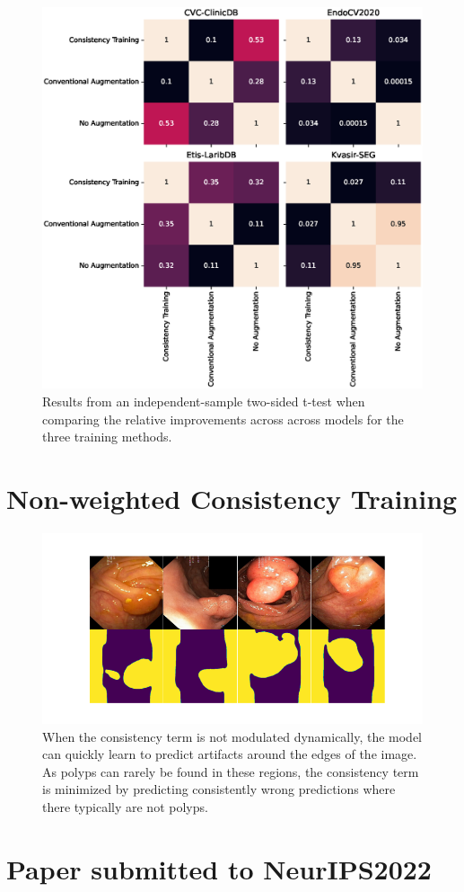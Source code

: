 \begin{figure}[htb]
    \centering
    \includegraphics[width=\linewidth]{illustrations/ensemble_improvement_pvals.eps}
    \caption[Ensemble Training Method Improvement Comparison]{Results from an independent-sample two-sided t-test when comparing the relative improvements across across models for the three training methods.}
    \label{fig:ensemble_improvement_tmethod}
\end{figure}
    

\newpage
\chapter{ Non-weighted Consistency Training}\label{non_weighted_ctraining}
\begin{figure}[htb]
    \centering
    \includegraphics[width=\linewidth]{illustrations/artefacts.png}
    \caption[Unweighted Consistency example]{When the consistency term is not modulated dynamically, the model can quickly learn to predict artifacts around the edges of the image. As polyps can rarely be found in these regions, the consistency term is minimized by predicting consistently wrong predictions where there typically are not polyps. }
    \label{fig:non_weighted_ctraining}
\end{figure}

\chapter{Paper submitted to NeurIPS2022} \label{Paper}
\setcounter{chapter}{8}
\setcounter{section}{0}
\setcounter{chapter}{0}
\setcounter{section}{0} 
 


